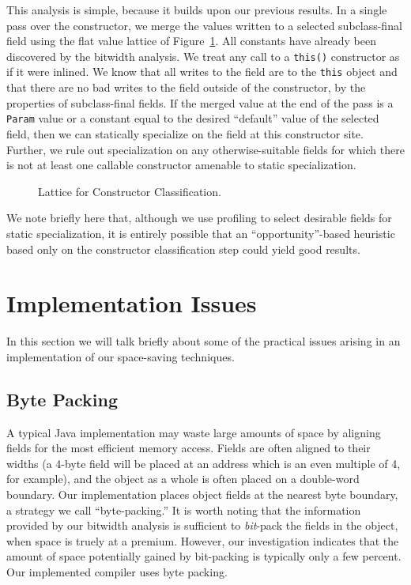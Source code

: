 \documentclass[oribibl]{llncs}
\newcommand{\figscale}{1.0}
\begin{document}
This analysis is simple, because it builds upon our previous results.
In a single pass over the constructor, we merge the values written
to a selected subclass-final field using the flat value lattice
of Figure~\ref{fig:cclat}.  All constants have already been discovered
by the bitwidth analysis.  We treat any call to a {\tt this()}
constructor as if it were inlined.  We know that all writes to the
field are to the {\tt this} object and that there are no bad writes to
the field outside of the constructor, by the properties of
subclass-final fields. If the merged value at the end of the pass 
is a {\tt Param} value or a constant equal to the desired ``default''
value of the selected field,
then we can statically specialize on the field at this constructor
site.  Further, we rule out specialization on any otherwise-suitable
fields for which there is not at least one callable constructor
amenable to static specialization.
%
\begin{figure}
\begin{center}
\renewcommand{\figscale}{0.6}
\end{center}
\caption{Lattice for Constructor Classification.}
\label{fig:cclat}
\end{figure}

We note briefly here that, although we use profiling to select desirable
fields for static specialization, it is entirely possible that an
``opportunity''-based heuristic based only on the constructor
classification step could yield good results.
%
\section{Implementation Issues}
%
In this section we will talk briefly about some of the practical
issues arising in an implementation of our space-saving techniques.
%
\subsection{Byte Packing}
%
A typical Java implementation may waste large amounts of space by
aligning fields for the most efficient memory access.  Fields are
often aligned to their widths (a 4-byte field will be placed at an address
which is an even multiple of 4, for example), and the object as a
whole is often placed on a double-word boundary. Our implementation
places object fields at the nearest byte boundary, a strategy we
call ``byte-packing.''
It is worth noting that the information provided by our bitwidth
analysis is sufficient to {\it bit}-pack the fields in the object,
when space is truely at a premium.  However, our investigation
indicates that the amount of space potentially gained by bit-packing 
is typically only a few percent.  Our implemented compiler uses byte
packing.
\end{document}
